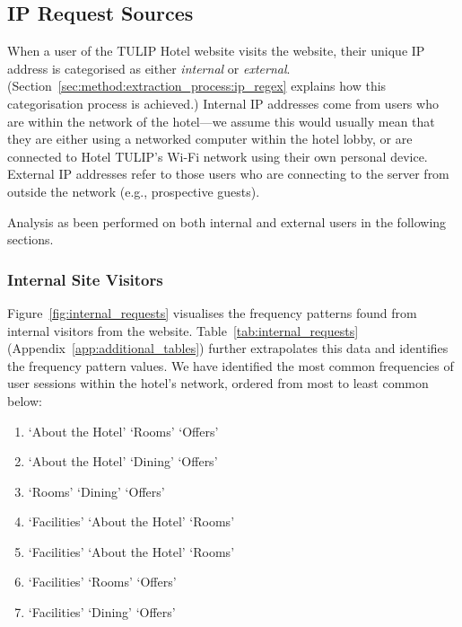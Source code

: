 \subsection{IP Request Sources}
\label{sec:results:ip_source}

When a user of the TULIP Hotel website visits the website, their unique IP address is categorised as either \textit{internal} or \textit{external}. (Section~\ref{sec:method:extraction_process:ip_regex} explains how this categorisation process is achieved.) Internal IP addresses come from users who are within the network of the hotel---we assume this would usually mean that they are either using a networked computer within the hotel lobby, or are connected to Hotel TULIP's Wi-Fi network using their own personal device. External IP addresses refer to those users who are connecting to the server from outside the network (e.g., prospective guests).

Analysis as been performed on both internal and external users in the following sections.

\subsubsection{Internal Site Visitors}
\label{sec:results:ip_source:internal}

Figure~\ref{fig:internal_requests} visualises the frequency patterns found from internal visitors from the website. Table~\ref{tab:internal_requests} (Appendix~\ref{app:additional_tables}) further extrapolates this data and identifies the frequency pattern values. We have identified the most common frequencies of user sessions within the hotel's network, ordered from most to least common below:

\begin{enumerate}
  \item `About the Hotel' \ra{} `Rooms' \ra{} `Offers'
  \item `About the Hotel' \ra{} `Dining' \ra{} `Offers'
  \item `Rooms' \ra{} `Dining' \ra{} `Offers'
  \item `Facilities' \ra{} `About the Hotel' \ra{} `Rooms'
  \item `Facilities' \ra{} `About the Hotel' \ra{} `Rooms'
  \item `Facilities' \ra{} `Rooms' \ra{} `Offers'
  \item `Facilities' \ra{} `Dining' \ra{} `Offers'
\end{enumerate}


